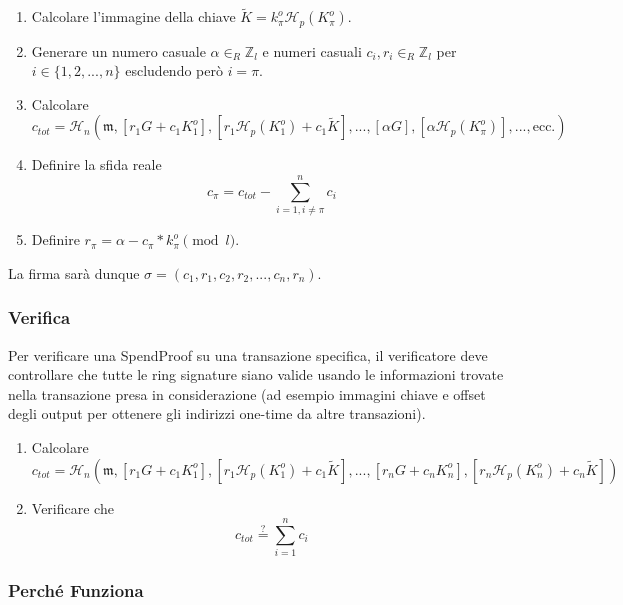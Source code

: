 \begin{enumerate}
	\item Calcolare l’immagine della chiave \(\tilde{K} = k^o_\pi \mathcal{H}_p(K^o_\pi)\).

	\item Generare un numero casuale \(\alpha \in_R \mathbb{Z}_l\) e numeri casuali \(c_i, r_i \in_R \mathbb{Z}_l\) per \(i \in \{1, 2, ..., n\}\) escludendo però \(i = \pi\).

	\item Calcolare
	\[c_{tot} = \mathcal{H}_n(\mathfrak{m},[r_1 G + c_1 K^o_1],[r_1 \mathcal{H}_p(K^o_1) + c_1 \tilde{K}],...,[\alpha G],[\alpha \mathcal{H}_p(K^o_{\pi})],...,\textrm{ecc.})\]

	\item Definire la sfida reale
	\[c_{\pi} = c_{tot} - \sum^{n}_{i=1,i\neq \pi} c_i\]

	\item Definire \(r_{\pi} = \alpha - c_{\pi}*k^o_{\pi} \pmod l\).
\end{enumerate}

La firma sarà dunque $\sigma = (c_1, r_1,c_2,r_2,...,c_n,r_n)$.

\subsubsection*{Verifica}

Per verificare una SpendProof su una transazione specifica, il verificatore deve controllare che tutte le ring signature siano valide usando le informazioni trovate nella transazione presa in considerazione (ad esempio immagini chiave e offset degli output per ottenere gli indirizzi one-time da altre transazioni).

\begin{enumerate}
	\item Calcolare
	\[c_{tot} = \mathcal{H}_n(\mathfrak{m},[r_1 G + c_1 K^o_1],[r_1 \mathcal{H}_p(K^o_1) + c_1 \tilde{K}],...,[r_n G + c_n K^o_n],[r_n \mathcal{H}_p(K^o_n) + c_n \tilde{K}])\]

	\item Verificare che
	\[c_{tot} \stackrel{?}{=} \sum^{n}_{i=1} c_i\]
\end{enumerate}

\subsubsection*{Perché Funziona}


